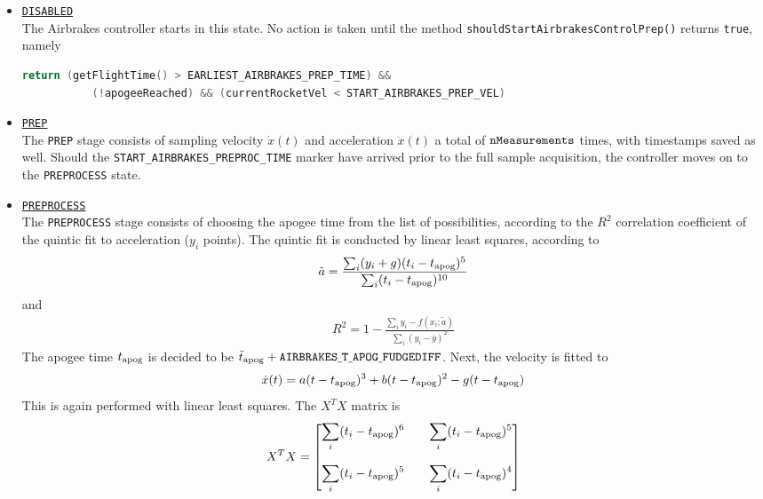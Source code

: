 \documentclass{amsdtx}
\begin{document}
\begin{itemize}
	\item {\color[HTML]{3C78D8}\underline{\tt  DISABLED}}\\[.5em]
	The Airbrakes controller starts in this state. No action is taken until the method {\tt shouldStartAirbrakesControlPrep()} returns {\tt true}, namely
	\begin{lstlisting}[language=c++]
	return (getFlightTime() > EARLIEST_AIRBRAKES_PREP_TIME) && 
		   (!apogeeReached) && (currentRocketVel < START_AIRBRAKES_PREP_VEL)\end{lstlisting}
	\item {\color[HTML]{A64D79} \underline{\tt PREP}}\\[.5em]
	The {\tt PREP} stage consists of sampling velocity $\dot x(t)$ and acceleration $\ddot x(t)$ a total of $\tt nMeasurements$ times, with timestamps saved as well. Should the \verb|START_AIRBRAKES_PREPROC_TIME| marker have arrived prior to the full sample acquisition, the controller moves on to the {\tt PREPROCESS} state. \\
	\item {\color[HTML]{134F5C} \underline{\tt PREPROCESS}}\\[.5em]
	The {\tt PREPROCESS} stage consists of choosing the apogee time from the list of possibilities, according to the $R^2$ correlation coefficient of the quintic fit to acceleration ($y_i$ points). The quintic fit is conducted by linear least squares, according to
	\begin{align}
		\tilde a = \frac{\sum_i (y_i+g)(t_i-t_{\rm apog})^5}{\sum_i (t_i-t_{\rm apog})^{10}}
	\end{align}
	and
	\begin{align}
		R^2 = 1 - \frac{ \sum_i y_i - f(x_i;\tilde a)}{\sum_i(y_i-\overline y)^2}
	\end{align}
	The apogee time $t_{\rm apog}$ is decided to be $\tilde t_{\rm apog}+\tt AIRBRAKES\underline{~}T\underline{~}APOG\underline{~}FUDGEDIFF$. Next, the velocity is fitted to 
	\begin{align}
		\dot{x}(t) = a(t-t_{\rm apog})^3 + b(t-t_{\rm apog})^2 - g(t-t_{\rm apog})
	\end{align}
	This is again performed with linear least squares. The $X^TX$ matrix is
	\begin{align}
		X^TX = \begin{bmatrix}
			\displaystyle\sum_i(t_i-t_{\rm apog})^6 &&\displaystyle \sum_i(t_i-t_{\rm apog})^5 \\[2em]
			\displaystyle\sum_i(t_i-t_{\rm apog})^5 && \displaystyle\sum_i(t_i-t_{\rm apog})^4

\end{bmatrix}
\end{align}
\end{itemize}
\end{document}
